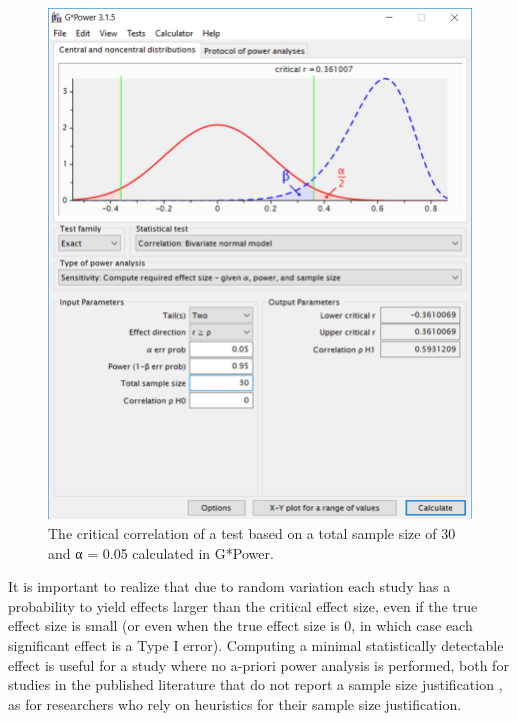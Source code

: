 \documentclass[
  oneside]{book}
\begin{document}
\begin{figure}

{\centering \includegraphics[width=1\linewidth]{images/gpowcrit2} 

}

\caption{The critical correlation of a test based on a total sample size of 30 and α = 0.05 calculated in G*Power.}\label{fig:gcrit2}
\end{figure}

It is important to realize that due to random variation each study has a probability to yield effects larger than the critical effect size, even if the true effect size is small (or even when the true effect size is 0, in which case each significant effect is a Type I error). Computing a minimal statistically detectable effect is useful for a study where no a-priori power analysis is performed, both for studies in the published literature that do not report a sample size justification \citep{lakens_equivalence_2018}, as for researchers who rely on heuristics for their sample size justification.
\end{document}
